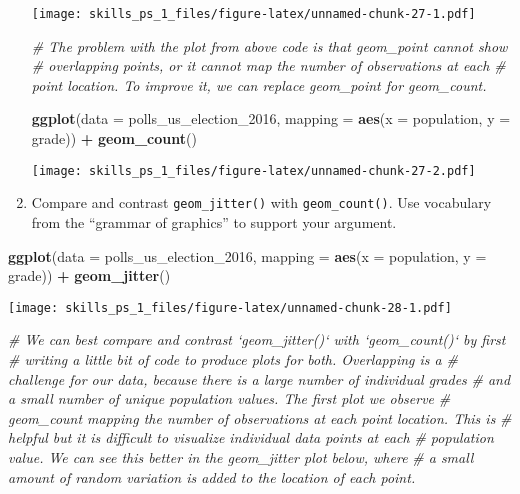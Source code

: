 \documentclass[
]{article}
\newenvironment{Shaded}{\begin{snugshade}}{\end{snugshade}}
\newcommand{\CommentTok}[1]{\textcolor[rgb]{0.56,0.35,0.01}{\textit{#1}}}
\newcommand{\DataTypeTok}[1]{\textcolor[rgb]{0.13,0.29,0.53}{#1}}
\newcommand{\DecValTok}[1]{\textcolor[rgb]{0.00,0.00,0.81}{#1}}
\newcommand{\KeywordTok}[1]{\textcolor[rgb]{0.13,0.29,0.53}{\textbf{#1}}}
\newcommand{\NormalTok}[1]{#1}
\newcommand{\OperatorTok}[1]{\textcolor[rgb]{0.81,0.36,0.00}{\textbf{#1}}}
\newcommand{\StringTok}[1]{\textcolor[rgb]{0.31,0.60,0.02}{#1}}
\begin{document}
\begin{enumerate}
  \texttt{[image: skills\_ps\_1\_files/figure-latex/unnamed-chunk-27-1.pdf]}

\begin{Shaded}
\begin{Highlighting}[]
\CommentTok{# The problem with the plot from above code is that geom_point cannot show}
\CommentTok{# overlapping points, or it cannot map the number of observations at each }
\CommentTok{# point location. To improve it, we can replace geom_point for geom_count.}

    \KeywordTok{ggplot}\NormalTok{(}\DataTypeTok{data =}\NormalTok{ polls_us_election_}\DecValTok{2016}\NormalTok{, }
       \DataTypeTok{mapping =} \KeywordTok{aes}\NormalTok{(}\DataTypeTok{x =}\NormalTok{ population, }\DataTypeTok{y =}\NormalTok{ grade)) }\OperatorTok{+}\StringTok{ }
\StringTok{  }\KeywordTok{geom_count}\NormalTok{()}
\end{Highlighting}
\end{Shaded}

  \texttt{[image: skills\_ps\_1\_files/figure-latex/unnamed-chunk-27-2.pdf]}
\item
  Compare and contrast \texttt{geom\_jitter()} with
  \texttt{geom\_count()}. Use vocabulary from the ``grammar of
  graphics'' to support your argument.
\end{enumerate}

\begin{Shaded}
\begin{Highlighting}[]
        \KeywordTok{ggplot}\NormalTok{(}\DataTypeTok{data =}\NormalTok{ polls_us_election_}\DecValTok{2016}\NormalTok{, }
           \DataTypeTok{mapping =} \KeywordTok{aes}\NormalTok{(}\DataTypeTok{x =}\NormalTok{ population, }\DataTypeTok{y =}\NormalTok{ grade)) }\OperatorTok{+}\StringTok{ }
\StringTok{      }\KeywordTok{geom_jitter}\NormalTok{()}
\end{Highlighting}
\end{Shaded}

\texttt{[image: skills\_ps\_1\_files/figure-latex/unnamed-chunk-28-1.pdf]}

\begin{Shaded}
\begin{Highlighting}[]
\CommentTok{# We can best compare and contrast `geom_jitter()` with `geom_count()` by first}
\CommentTok{# writing a little bit of code to produce plots for both. Overlapping is a }
\CommentTok{# challenge for our data, because there is a large number of individual grades}
\CommentTok{# and a small number of unique population values. The first plot we observe}
\CommentTok{# geom_count mapping the number of observations at each point location. This is}
\CommentTok{# helpful but it is difficult to visualize individual data points at each}
\CommentTok{# population value. We can see this better in the geom_jitter plot below, where}
\CommentTok{# a small amount of random variation is added to the location of each point.}
\end{Highlighting}
\end{Shaded}
\end{document}
